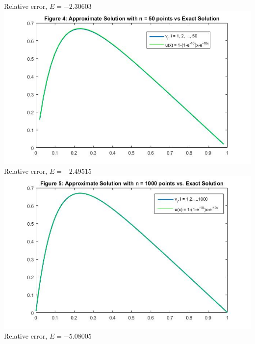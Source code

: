 \documentclass[a4paper, 12pt, twoside]{article}
\begin{document}
Relative error, $E =-2.30603$\\
\includegraphics[scale=.5]{fig4}\\
Relative error, $E =-2.49515$\\
\newpage
\includegraphics[scale=.5]{fig5}\\
Relative error, $E =-5.08005$\\
\end{document}
